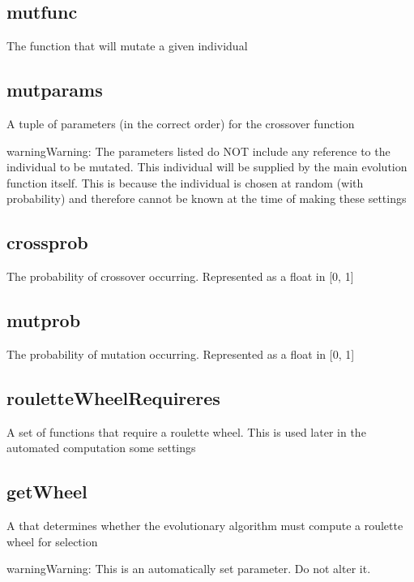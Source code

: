 \documentclass[letterpaper,10pt,english]{sphinxmanual}
\begin{document}
\subsection{mutfunc}
\label{settings.py:mutfunc}
The function that will mutate a given individual


\subsection{mutparams}
\label{settings.py:mutparams}
A tuple of parameters (in the correct order) for the crossover function

\begin{notice}{warning}{Warning:}
The parameters listed do NOT include any reference to the individual to be mutated. This individual will be supplied by the main evolution function itself. This is because the individual is chosen at random (with probability) and therefore cannot be known at the time of making these settings
\end{notice}


\subsection{crossprob}
\label{settings.py:crossprob}
The probability of crossover occurring. Represented as a float in {[}0, 1{]}


\subsection{mutprob}
\label{settings.py:mutprob}
The probability of mutation occurring. Represented as a float in {[}0, 1{]}


\subsection{rouletteWheelRequireres}
\label{settings.py:roulettewheelrequireres}
A set of functions that require a roulette wheel. This is used later in the automated computation some settings


\subsection{getWheel}
\label{settings.py:getwheel}
A  that determines whether the evolutionary algorithm must compute a roulette wheel for selection

\begin{notice}{warning}{Warning:}
This is an automatically set parameter. Do not alter it.
\end{notice}
\end{document}
